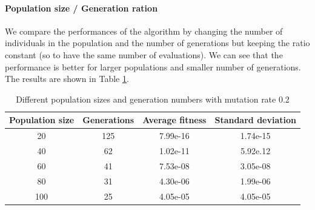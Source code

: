 \paragraph*{Population size / Generation ration}
We compare the performances of the algorithm by changing the number of individuals in the population and the number of generations but keeping the ratio constant (so to have the same number of evaluations). We can see that the performance is better for larger populations and smaller number of generations. The results are shown in Table \ref{tab:pso-pop-gen}.
\begin{table}
    \centering
    \begin{tabular}{|c|c|c|c|}
        Population size & Generations & Average fitness & Standard deviation \\ \hline
        20              & 125         & 7.99e-16        & 1.74e-15           \\
        40              & 62          & 1.02e-11        & 5.92e.12           \\
        60              & 41          & 7.53e-08        & 3.05e-08           \\
        80              & 31          & 4.30e-06        & 1.99e-06           \\
        100             & 25          & 4.05e-05        & 4.05e-05           \\
    \end{tabular}
    \caption{Different population sizes and generation numbers with mutation rate 0.2}
    \label{tab:pso-pop-gen}
\end{table}

